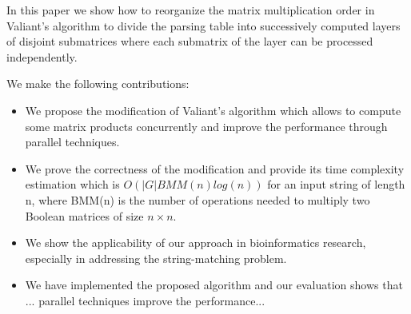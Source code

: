 In this paper we show how to reorganize the matrix multiplication order in Valiant's algorithm to divide the parsing table into successively computed layers of disjoint submatrices where each submatrix of the layer can be processed independently.

We make the following contributions:
\begin{itemize}
  \item We propose the modification of Valiant's algorithm which allows to compute some matrix products concurrently and improve the performance through parallel techniques.
  \item We prove the correctness of the modification and provide its time complexity estimation which is $O(|G|BMM(n)log(n))$ for an input string of length n, where BMM(n) is the number of operations needed to multiply two Boolean matrices of size $n \times n$.
  \item We show the applicability of our approach in bioinformatics research, especially in addressing the string-matching problem.
  \item We have implemented the proposed algorithm and our evaluation shows that ... parallel techniques improve the performance...
\end{itemize}

